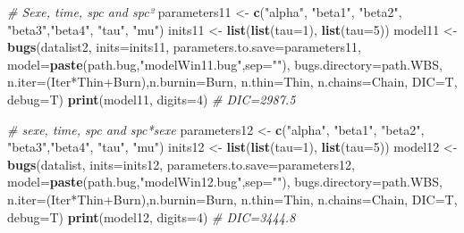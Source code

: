 \documentclass[]{article}
\newenvironment{Shaded}{\begin{snugshade}}{\end{snugshade}}
\newcommand{\KeywordTok}[1]{\textcolor[rgb]{0.13,0.29,0.53}{\textbf{{#1}}}}
\newcommand{\DataTypeTok}[1]{\textcolor[rgb]{0.13,0.29,0.53}{{#1}}}
\newcommand{\DecValTok}[1]{\textcolor[rgb]{0.00,0.00,0.81}{{#1}}}
\newcommand{\StringTok}[1]{\textcolor[rgb]{0.31,0.60,0.02}{{#1}}}
\newcommand{\CommentTok}[1]{\textcolor[rgb]{0.56,0.35,0.01}{\textit{{#1}}}}
\newcommand{\NormalTok}[1]{{#1}}
\begin{document}
\begin{Shaded}
\begin{Highlighting}[]
{{\CommentTok{# Sexe, time, spc and spc²}
\NormalTok{parameters11 <-}\StringTok{ }\KeywordTok{c}\NormalTok{(}\StringTok{"alpha"}\NormalTok{, }\StringTok{"beta1"}\NormalTok{, }\StringTok{"beta2"}\NormalTok{, }\StringTok{"beta3"}\NormalTok{,}\StringTok{"beta4"}\NormalTok{, }\StringTok{"tau"}\NormalTok{, }\StringTok{"mu"}\NormalTok{)}
\NormalTok{inits11 <-}\StringTok{ }\KeywordTok{list}\NormalTok{(}\KeywordTok{list}\NormalTok{(}\DataTypeTok{tau=}\DecValTok{1}\NormalTok{), }\KeywordTok{list}\NormalTok{(}\DataTypeTok{tau=}\DecValTok{5}\NormalTok{))}
\NormalTok{model11 <-}\StringTok{ }\KeywordTok{bugs}\NormalTok{(datalist2, }\DataTypeTok{inits=}\NormalTok{inits11, }\DataTypeTok{parameters.to.save=}\NormalTok{parameters11,}
                \DataTypeTok{model=}\KeywordTok{paste}\NormalTok{(path.bug,}\StringTok{"modelWin11.bug"}\NormalTok{,}\DataTypeTok{sep=}\StringTok{""}\NormalTok{),}
                \DataTypeTok{bugs.directory=}\NormalTok{path.WBS,               }
                \DataTypeTok{n.iter=}\NormalTok{(Iter*Thin+Burn),}\DataTypeTok{n.burnin=}\NormalTok{Burn, }\DataTypeTok{n.thin=}\NormalTok{Thin, }\DataTypeTok{n.chains=}\NormalTok{Chain, }\DataTypeTok{DIC=}\NormalTok{T, }\DataTypeTok{debug=}\NormalTok{T)}
\KeywordTok{print}\NormalTok{(model11, }\DataTypeTok{digits=}\DecValTok{4}\NormalTok{)}
\CommentTok{# DIC=2987.5}

\CommentTok{# sexe, time, spc and spc*sexe}
\NormalTok{parameters12 <-}\StringTok{ }\KeywordTok{c}\NormalTok{(}\StringTok{"alpha"}\NormalTok{, }\StringTok{"beta1"}\NormalTok{, }\StringTok{"beta2"}\NormalTok{, }\StringTok{"beta3"}\NormalTok{,}\StringTok{"beta4"}\NormalTok{, }\StringTok{"tau"}\NormalTok{, }\StringTok{"mu"}\NormalTok{)}
\NormalTok{inits12 <-}\StringTok{ }\KeywordTok{list}\NormalTok{(}\KeywordTok{list}\NormalTok{(}\DataTypeTok{tau=}\DecValTok{1}\NormalTok{), }\KeywordTok{list}\NormalTok{(}\DataTypeTok{tau=}\DecValTok{5}\NormalTok{))}
\NormalTok{model12 <-}\StringTok{ }\KeywordTok{bugs}\NormalTok{(datalist, }\DataTypeTok{inits=}\NormalTok{inits12, }\DataTypeTok{parameters.to.save=}\NormalTok{parameters12,}
                \DataTypeTok{model=}\KeywordTok{paste}\NormalTok{(path.bug,}\StringTok{"modelWin12.bug"}\NormalTok{,}\DataTypeTok{sep=}\StringTok{""}\NormalTok{),}
                \DataTypeTok{bugs.directory=}\NormalTok{path.WBS,               }
                \DataTypeTok{n.iter=}\NormalTok{(Iter*Thin+Burn),}\DataTypeTok{n.burnin=}\NormalTok{Burn, }\DataTypeTok{n.thin=}\NormalTok{Thin, }\DataTypeTok{n.chains=}\NormalTok{Chain, }\DataTypeTok{DIC=}\NormalTok{T, }\DataTypeTok{debug=}\NormalTok{T)}
\KeywordTok{print}\NormalTok{(model12, }\DataTypeTok{digits=}\DecValTok{4}\NormalTok{)}
\CommentTok{# DIC=3444.8}

}}
\end{Highlighting}
\end{Shaded}
\end{document}
